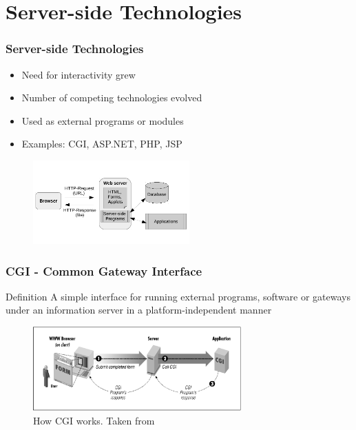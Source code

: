 \documentclass[9pt]{beamer}
\begin{document}
\section{Server-side Technologies}
\begin{frame}
\begin{multicols}{2}
\frametitle<presentation>{Server-side Technologies}
  \begin{itemize}
    \item Need for interactivity grew
    \item Number of competing technologies evolved
    \item Used as external programs or modules
    \item Examples: CGI, ASP.NET, PHP, JSP
  \end{itemize}
  
  \begin{figure}[h]
    \centerline{\includegraphics[width=6cm]{pics/webclient.pdf}}
  \end{figure}
\end{multicols}

\end{frame}

\begin{frame}
\frametitle<presentation>{CGI - Common Gateway Interface}
  \begin{block}{Definition \cite{cgiSpecs}}
    A simple interface for running external programs, software or gateways under an information server in a platform-independent manner
  \end{block}

  \begin{figure}[h]
    \centerline{\includegraphics[width=8cm]{pics/cgi.png}}
    \caption{How CGI works. Taken from \cite{gundavaram1996cgi}}
    \label{fig-cgi}
  \end{figure}

\end{frame}
\end{document}
